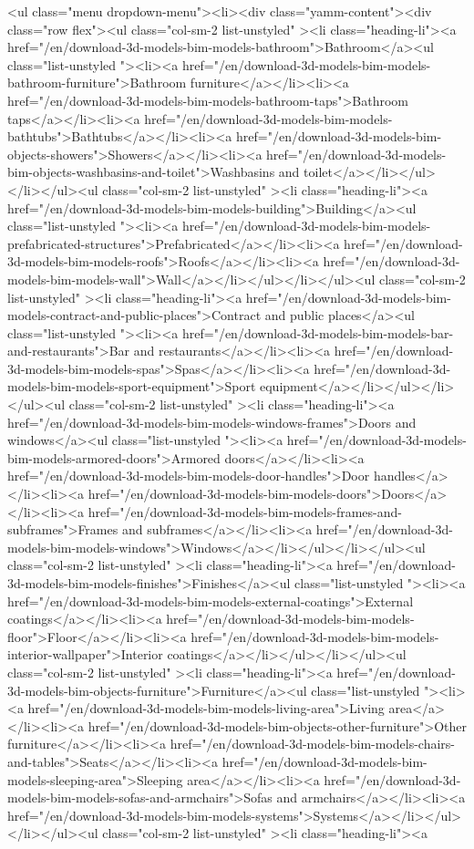                         
            <ul class="menu dropdown-menu"><li><div class="yamm-content"><div class="row flex"><ul class="col-sm-2 list-unstyled" ><li class="heading-li"><a href="/en/download-3d-models-bim-models-bathroom">Bathroom</a><ul class="list-unstyled "><li><a href="/en/download-3d-models-bim-models-bathroom-furniture">Bathroom furniture</a></li><li><a href="/en/download-3d-models-bim-models-bathroom-taps">Bathroom taps</a></li><li><a href="/en/download-3d-models-bim-models-bathtubs">Bathtubs</a></li><li><a href="/en/download-3d-models-bim-objects-showers">Showers</a></li><li><a href="/en/download-3d-models-bim-objects-washbasins-and-toilet">Washbasins and toilet</a></li></ul></li></ul><ul class="col-sm-2 list-unstyled" ><li class="heading-li"><a href="/en/download-3d-models-bim-models-building">Building</a><ul class="list-unstyled "><li><a href="/en/download-3d-models-bim-models-prefabricated-structures">Prefabricated</a></li><li><a href="/en/download-3d-models-bim-models-roofs">Roofs</a></li><li><a href="/en/download-3d-models-bim-models-wall">Wall</a></li></ul></li></ul><ul class="col-sm-2 list-unstyled" ><li class="heading-li"><a href="/en/download-3d-models-bim-models-contract-and-public-places">Contract and public places</a><ul class="list-unstyled "><li><a href="/en/download-3d-models-bim-models-bar-and-restaurants">Bar and restaurants</a></li><li><a href="/en/download-3d-models-bim-models-spas">Spas</a></li><li><a href="/en/download-3d-models-bim-models-sport-equipment">Sport equipment</a></li></ul></li></ul><ul class="col-sm-2 list-unstyled" ><li class="heading-li"><a href="/en/download-3d-models-bim-models-windows-frames">Doors and windows</a><ul class="list-unstyled "><li><a href="/en/download-3d-models-bim-models-armored-doors">Armored doors</a></li><li><a href="/en/download-3d-models-bim-models-door-handles">Door handles</a></li><li><a href="/en/download-3d-models-bim-models-doors">Doors</a></li><li><a href="/en/download-3d-models-bim-models-frames-and-subframes">Frames and subframes</a></li><li><a href="/en/download-3d-models-bim-models-windows">Windows</a></li></ul></li></ul><ul class="col-sm-2 list-unstyled" ><li class="heading-li"><a href="/en/download-3d-models-bim-models-finishes">Finishes</a><ul class="list-unstyled "><li><a href="/en/download-3d-models-bim-models-external-coatings">External coatings</a></li><li><a href="/en/download-3d-models-bim-models-floor">Floor</a></li><li><a href="/en/download-3d-models-bim-models-interior-wallpaper">Interior coatings</a></li></ul></li></ul><ul class="col-sm-2 list-unstyled" ><li class="heading-li"><a href="/en/download-3d-models-bim-objects-furniture">Furniture</a><ul class="list-unstyled "><li><a href="/en/download-3d-models-bim-models-living-area">Living area</a></li><li><a href="/en/download-3d-models-bim-objects-other-furniture">Other furniture</a></li><li><a href="/en/download-3d-models-bim-models-chairs-and-tables">Seats</a></li><li><a href="/en/download-3d-models-bim-models-sleeping-area">Sleeping area</a></li><li><a href="/en/download-3d-models-bim-models-sofas-and-armchairs">Sofas and armchairs</a></li><li><a href="/en/download-3d-models-bim-models-systems">Systems</a></li></ul></li></ul><ul class="col-sm-2 list-unstyled" ><li class="heading-li"><a 